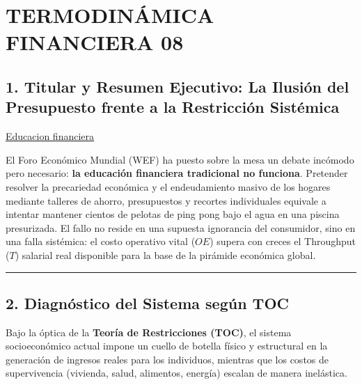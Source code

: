 \documentclass[12pt,letterpaper]{article}
\begin{document}
\hypertarget{termodinuxe1mica-financiera-08}{%
\section{TERMODINÁMICA FINANCIERA
08}\label{termodinuxe1mica-financiera-08}}

\hypertarget{titular-y-resumen-ejecutivo-la-ilusiuxf3n-del-presupuesto-frente-a-la-restricciuxf3n-sistuxe9mica}{%
\subsection{1. Titular y Resumen Ejecutivo: La Ilusión del Presupuesto
frente a la Restricción
Sistémica}\label{titular-y-resumen-ejecutivo-la-ilusiuxf3n-del-presupuesto-frente-a-la-restricciuxf3n-sistuxe9mica}}

\href{https://www.eleconomista.com.mx/finanzaspersonales/educacion-financiera-funciona-dice-foro-economico-mundial-20261007-837387.html}{Educacion
financiera}

El Foro Económico Mundial (WEF) ha puesto sobre la mesa un debate
incómodo pero necesario: \textbf{la educación financiera tradicional no
funciona}. Pretender resolver la precariedad económica y el
endeudamiento masivo de los hogares mediante talleres de ahorro,
presupuestos y recortes individuales equivale a intentar mantener
cientos de pelotas de ping pong bajo el agua en una piscina presurizada.
El fallo no reside en una supuesta ignorancia del consumidor, sino en
una falla sistémica: el costo operativo vital (\(OE\)) supera con creces
el Throughput (\(T\)) salarial real disponible para la base de la
pirámide económica global.

\begin{center}\rule{0.5\linewidth}{0.5pt}\end{center}

\hypertarget{diagnuxf3stico-del-sistema-seguxfan-toc}{%
\subsection{2. Diagnóstico del Sistema según
TOC}\label{diagnuxf3stico-del-sistema-seguxfan-toc}}

Bajo la óptica de la \textbf{Teoría de Restricciones (TOC)}, el sistema
socioeconómico actual impone un cuello de botella físico y estructural
en la generación de ingresos reales para los individuos, mientras que
los costos de supervivencia (vivienda, salud, alimentos, energía)
escalan de manera inelástica.
\end{document}
